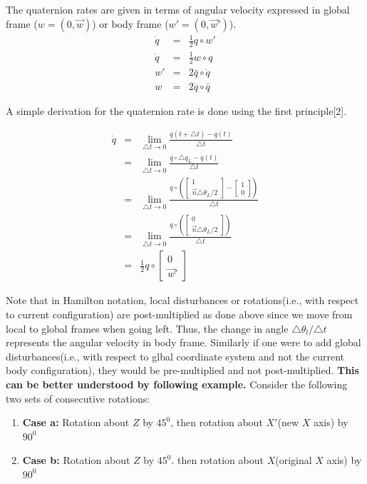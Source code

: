 \documentclass{article}
\begin{document}
	The quaternion rates are given in terms of angular velocity expressed in global frame ($w = (0,\vec{w})$) or body frame ($w' = (0,\vec{w}')$).
	\begin{eqnarray}
	\dot{q} &=& \frac{1}{2}q\circ w'\\
	\dot{q} &=& \frac{1}{2}w \circ q\\
	w' &=& 2\bar{q}\circ \dot{q}\\
	w &=& 2\dot{q}\circ \bar{q}
	\end{eqnarray}
	
	A simple derivation for the quaternion rate is done using the first principle[2].
	
	\begin{eqnarray}
	\dot{q} &=& \lim\limits_{\triangle t\rightarrow 0}\frac{q(t+\triangle t)-q(t)}{\triangle t} \\
	& = & \lim\limits_{\triangle t\rightarrow 0}\frac{q\circ \triangle q_L-q(t)}{\triangle t} \\
	& = & \lim\limits_{\triangle t\rightarrow 0}\frac{q\circ (\begin{bmatrix}
		1\\ \vec{n}\triangle\theta_L/2
		\end{bmatrix}-\begin{bmatrix}
		1\\0
		\end{bmatrix})}{\triangle t} \\
	& = & \lim\limits_{\triangle t\rightarrow 0}\frac{q\circ (\begin{bmatrix}
		0\\ \vec{n}\triangle \theta_L/2
		\end{bmatrix})}{\triangle t} \\
	& = & \frac{1}{2}q\circ \begin{bmatrix}
	0 \\ \vec{w}' \label{qder}
	\end{bmatrix}
	\end{eqnarray}
	
	Note that in Hamilton notation, local disturbances or rotations(i.e., with respect to current configuration) are post-multiplied as done above since we move from local to global frames when going left. Thus, the change in angle $\triangle\theta_l/\triangle t$ represents the angular velocity in body frame. Similarly if one were to add global disturbances(i.e., with respect to glbal coordinate system and not the current body configuration), they would be pre-multiplied and not post-multiplied. \textbf{This can be better understood by following example. } Consider the following two sets of consecutive rotations:
	\begin{enumerate}
		\item \textbf{Case a:} Rotation about $ Z $ by $45^0$, then rotation about $ X' $(new $ X $ axis) by $90^0$
		\item \textbf{Case b:} Rotation about $ Z $ by $45^0$. then rotation about $ X $(original $ X $ axis) by $90^0$
	\end{enumerate}
	
\end{document}
